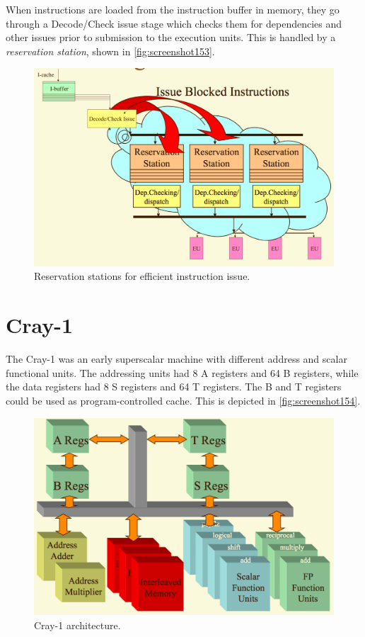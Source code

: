 When instructions are loaded from the instruction buffer in memory, they go through a Decode/Check issue stage which checks them for dependencies and other issues prior to submission to the execution units. This is handled by a \textit{reservation station}, shown in \autoref{fig:screenshot153}.

\begin{figure}
\centering
\includegraphics[width=0.7\linewidth]{screenshot153}
\caption{Reservation stations for efficient instruction issue.}
\label{fig:screenshot153}
\end{figure}

\section{Cray-1}
The Cray-1 was an early superscalar machine with different address and scalar functional units. The addressing units had 8 A registers and 64 B registers, while the data registers had 8 S registers and 64 T registers. The B and T registers could be used as program-controlled cache. This is depicted in \autoref{fig:screenshot154}.

\begin{figure}
\centering
\includegraphics[width=0.7\linewidth]{screenshot154}
\caption{Cray-1 architecture.}
\label{fig:screenshot154}
\end{figure}

